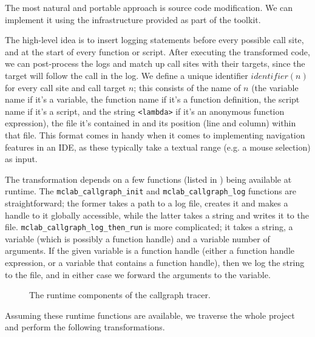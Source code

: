 The most natural and portable approach is source code modification. We can
implement it using the infrastructure provided as part of the \mclab toolkit.

The high-level idea is to insert logging statements before every possible call
site, and at the start of every function or script. After executing the
transformed code, we can post-process the logs and match up call sites with
their targets, since the target will follow the call in the log. We define a
unique identifier $identifier(n)$ for every call site and call target $n$; this
consists of the name of $n$ (the variable name if it's a variable, the function
name if it's a function definition, the script name if it's a script, and the
string \texttt{<lambda>} if it's an anonymous function expression), the file
it's contained in and its position (line and column) within that file. This
format comes in handy when it comes to implementing navigation features in an
IDE, as these typically take a textual range (e.g. a mouse selection) as input.

The transformation depends on a few functions (listed in
) being available at runtime. The
\texttt{mclab\_callgraph\_init} and \texttt{mclab\_callgraph\_log} functions
are straightforward; the former takes a path to a log file, creates it and
makes a handle to it globally accessible, while the latter takes a string and
writes it to the file. \newline \texttt{mclab\_callgraph\_log\_then\_run} is more
complicated; it takes a string, a variable (which is possibly a function
handle) and a variable number of arguments. If the given variable is a function
handle (either a function handle expression, or a variable that contains a
function handle), then we log the string to the file, and in either case we
forward the arguments to the variable.

\begin{figure}[htbp]

\caption{The runtime components of the callgraph tracer.}
\label{Fig:CallgraphRuntime}
\end{figure}

Assuming these runtime functions are available, we traverse the whole project
and perform the following transformations.

